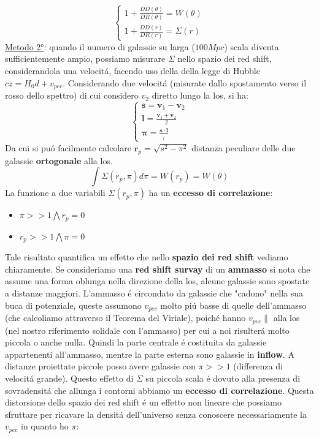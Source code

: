 \documentclass[12pt, a4paper]{article}
\begin{document}
\begin{equation}
\begin{cases}
1+\frac{DD(\theta)}{DR(\theta)}=W(\theta)
\\
1+\frac{DD(r)}{DR(r)}=\Sigma(r)
\end{cases}
\end{equation}
\underline{Metodo 2°}: quando il numero di galassie su larga ($100Mpc$) scala diventa sufficientemente ampio, possiamo misurare $\Sigma$ nello spazio dei red shift, considerandola una velocit\'{a}, facendo uso della della legge di Hubble $cz=H_0d+v_{pec}$. Considerando due velocit\'{a} (misurate dallo spostamento verso il rosso dello spettro) di cui considero $v_2$ diretto lungo la los, si ha:
\begin{equation}
\begin{cases}
\mathbf{s}=\mathbf{v}_1-\mathbf{v}_2
\\
\mathbf{l}=\frac{\mathbf{v}_1+\mathbf{v}_2}{2}
\\
\mathbf{\pi}=\frac{\mathbf{s}\cdot\mathbf{l}}{_l}
\end{cases}
\end{equation}
Da cui si pu\'{o} facilmente calcolare $\mathbf{r}_p=\sqrt{s^2-\pi^2}$ distanza peculiare delle due galassie \textbf{ortogonale} alla los.
\begin{equation}
\int \Sigma(r_p, \pi) d\pi= W(r_p)=W(\theta)
\end{equation}
La funzione a due variabili $\Sigma(r_p, \pi)$ ha un \textbf{eccesso di correlazione}:
\begin{itemize}
\item $\pi>>1 \bigwedge r_p=0$
\item $r_p>>1 \bigwedge \pi=0$
\end{itemize}
Tale risultato quantifica un effetto che nello \textbf{spazio dei red shift} vediamo chiaramente. Se consideriamo una \textbf{red shift survay} di un \textbf{ammasso} si nota che assume una forma oblunga nella direzione della los, alcune galassie sono spostate a distanze maggiori. L'ammasso \'{e} circondato da galassie che "cadono" nella sua buca di potenziale, queste assumono $v_{pec}$ molto pi\'{u} basse di quelle dell'ammasso (che calcoliamo attraverso il Teorema del Viriale), poich\'{e} hanno $v_{pec}\parallel$ alla los (nel nostro riferimento solidale con l'ammasso) per cui a noi risulter\'{a} molto piccola o anche nulla. Quindi la parte centrale \'{e} costituita da galassie appartenenti all'ammasso, mentre la parte esterna sono galassie in \textbf{inflow}. A distanze proiettate piccole posso avere galassie con $\pi>>1$ (differenza di velocit\'{a} grande). Questo effetto di $\Sigma$ su piccola scala \'{e} dovuto alla presenza di sovradensit\'{a} che allunga i contorni abbiamo un \textbf{eccesso di correlazione}. Questa distorsione dello spazio dei red shift \'{e} un effetto non lineare che possiamo sfruttare per ricavare la densit\'{a} dell'universo senza conoscere necessariamente la $v_{pec}$ in quanto ho $\pi$:
\end{document}
